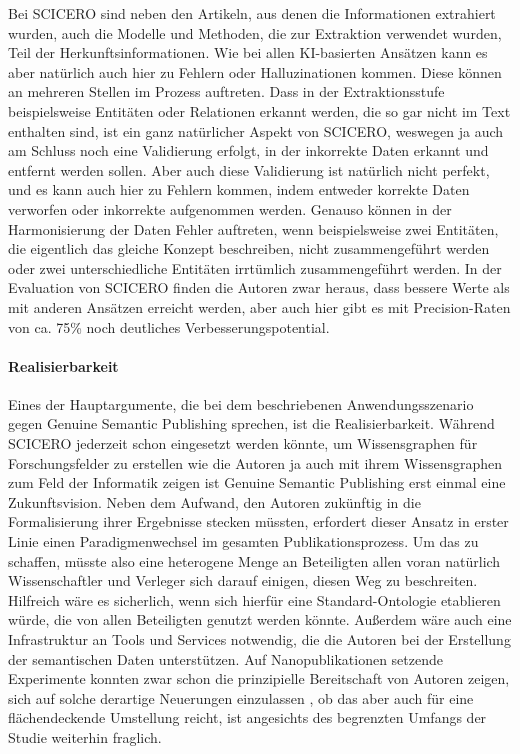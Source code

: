 Bei SCICERO sind neben den Artikeln, aus denen die Informationen extrahiert wurden, auch die Modelle und Methoden, die zur Extraktion verwendet wurden, Teil der Herkunftsinformationen.
Wie bei allen KI-basierten Ansätzen kann es aber natürlich auch hier zu Fehlern oder Halluzinationen kommen.
Diese können an mehreren Stellen im Prozess auftreten.
Dass in der Extraktionsstufe beispielsweise Entitäten oder Relationen erkannt werden, die so gar nicht im Text enthalten sind, ist ein ganz natürlicher Aspekt von SCICERO, weswegen ja auch am Schluss noch eine Validierung erfolgt, in der inkorrekte Daten erkannt und entfernt werden sollen.
Aber auch diese Validierung ist natürlich nicht perfekt, und es kann auch hier zu Fehlern kommen, indem entweder korrekte Daten verworfen oder inkorrekte aufgenommen werden.
Genauso können in der Harmonisierung der Daten Fehler auftreten, wenn beispielsweise zwei Entitäten, die eigentlich das gleiche Konzept beschreiben, nicht zusammengeführt werden oder zwei unterschiedliche Entitäten irrtümlich zusammengeführt werden.
In der Evaluation von SCICERO finden die Autoren zwar heraus, dass bessere Werte als mit anderen Ansätzen erreicht werden, aber auch hier gibt es mit Precision-Raten von ca. 75\% noch deutliches Verbesserungspotential.


\paragraph{Realisierbarkeit}

Eines der Hauptargumente, die bei dem beschriebenen Anwendungsszenario gegen Genuine Semantic Publishing sprechen, ist die Realisierbarkeit.
Während SCICERO jederzeit schon eingesetzt werden könnte, um Wissensgraphen für Forschungsfelder zu erstellen \textemdash wie die Autoren ja auch mit ihrem Wissensgraphen zum Feld der Informatik zeigen \cite{cskg} \textemdash ist Genuine Semantic Publishing erst einmal eine Zukunftsvision.
Neben dem Aufwand, den Autoren zukünftig in die Formalisierung ihrer Ergebnisse stecken müssten, erfordert dieser Ansatz in erster Linie einen Paradigmenwechsel im gesamten Publikationsprozess.
Um das zu schaffen, müsste also eine heterogene Menge an Beteiligten \textemdash allen voran natürlich Wissenschaftler und Verleger \textemdash sich darauf einigen, diesen Weg zu beschreiten.
Hilfreich wäre es sicherlich, wenn sich hierfür eine Standard-Ontologie etablieren würde, die von allen Beteiligten genutzt werden könnte.
Außerdem wäre auch eine Infrastruktur an Tools und Services notwendig, die die Autoren bei der Erstellung der semantischen Daten unterstützen.
Auf Nanopublikationen setzende Experimente konnten zwar schon die prinzipielle Bereitschaft von Autoren zeigen, sich auf solche derartige Neuerungen einzulassen \cite{nanopub-experiment}, ob das aber auch für eine flächendeckende Umstellung reicht, ist angesichts des begrenzten Umfangs der Studie weiterhin fraglich.

